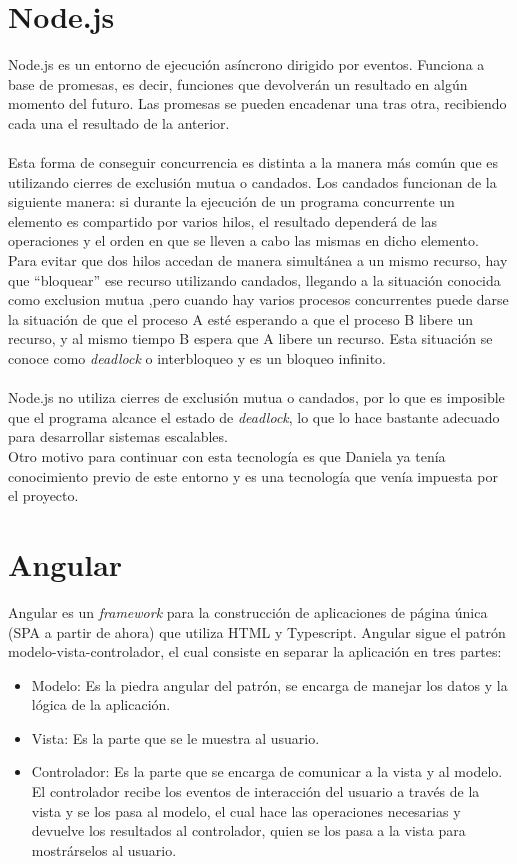 \documentclass[11pt]{book}
\begin{document}
\section{Node.js} 
Node.js es un entorno de ejecución asíncrono dirigido por eventos. Funciona a base de promesas, es decir, funciones que devolverán un resultado en algún momento del futuro. Las promesas se pueden encadenar una tras otra, recibiendo cada una el resultado de la anterior.\\\\
Esta forma de conseguir concurrencia es distinta a la manera más común que es utilizando cierres de exclusión mutua o candados. Los candados funcionan de la siguiente manera: si durante la ejecución de un programa concurrente un elemento es compartido por varios hilos, el resultado dependerá de las operaciones y el orden en que se lleven a cabo las mismas en dicho elemento. Para evitar que dos hilos accedan de manera simultánea a un mismo recurso, hay que ``bloquear'' ese recurso utilizando candados, llegando a la situación conocida como exclusion mutua ,pero cuando hay varios procesos concurrentes puede darse la situación de que el proceso A esté esperando a que el proceso B libere un recurso, y al mismo tiempo B espera que A libere un recurso. Esta situación se conoce como \emph{deadlock} o interbloqueo y es un bloqueo infinito.\\\\
Node.js no utiliza cierres de exclusión mutua o candados, por lo que es imposible que el programa alcance el estado de \emph{deadlock}, lo que lo hace bastante adecuado para desarrollar sistemas escalables.\\
Otro motivo para continuar con esta tecnología es que Daniela ya tenía conocimiento previo de este entorno y es una tecnología que venía impuesta por el proyecto.

\section{Angular}
Angular es un \emph{framework} para la construcción de aplicaciones de página única (SPA a partir de ahora) que utiliza HTML y Typescript. Angular sigue el patrón modelo-vista-controlador, el cual consiste en separar la aplicación en tres partes:
\begin{itemize}
	\item Modelo: Es la piedra angular del patrón, se encarga de manejar los datos y la lógica de la aplicación.
	\item Vista: Es la parte que se le muestra al usuario.
	\item Controlador: Es la parte que se encarga de comunicar a la vista y al modelo. El controlador recibe los eventos de interacción del usuario a través de la vista y se los pasa al modelo, el cual hace las operaciones necesarias y devuelve los resultados al controlador, quien se los pasa a la vista para mostrárselos al usuario.
\end{itemize}
\end{document}
